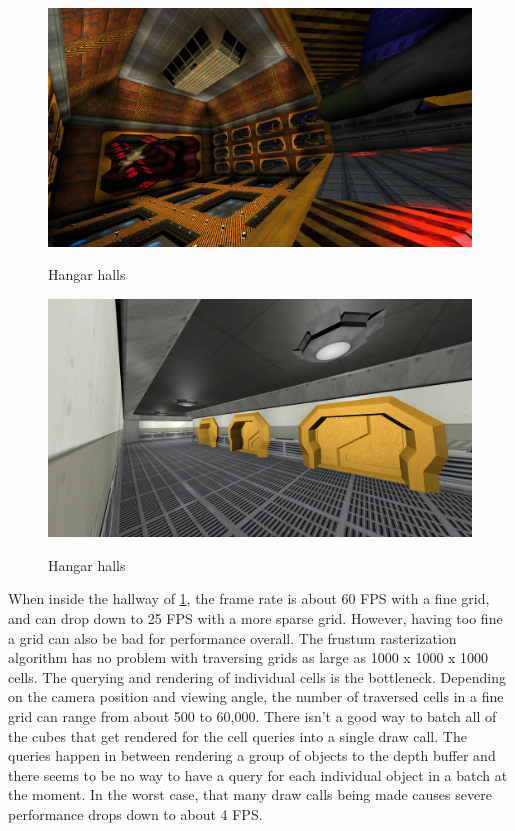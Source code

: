 \documentclass[12pt]{ucthesis}
\newcommand{\captionfonts}{\small\bf\ssp}
\begin{document}
\begin{figure}
\begin{center}
\includegraphics[width=\textwidth]{Images/Hangar.jpg}
\captionfonts
\caption[Hangar Bay]{Hangar halls}
\label{fig:hangar-bay}
\includegraphics[width=\textwidth]{Images/HallCorner.jpg}
\captionfonts
\caption[Hangar Halls]{Hangar halls}
\label{fig:hangar-halls}
\end{center}
\end{figure}

When inside the hallway of \ref{fig:hangar-halls}, the frame rate is about 60 FPS with a fine grid, and can drop down to 25 FPS with a more sparse grid.
However, having too fine a grid can also be bad for performance overall.
The frustum rasterization algorithm has no problem with traversing grids as large as 1000 x 1000 x 1000 cells.
The querying and rendering of individual cells is the bottleneck.
Depending on the camera position and viewing angle, the number of traversed cells in a fine grid can range from about 500 to 60,000.
There isn't a good way to batch all of the cubes that get rendered for the cell queries into a single draw call.
The queries happen in between rendering a group of objects to the depth buffer and there seems to be no way to have a query for each individual object in a batch at the moment.
In the worst case, that many draw calls being made causes severe performance drops down to about 4 FPS.
\end{document}
